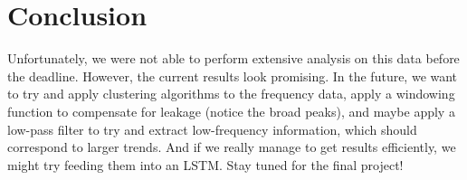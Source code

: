 \documentclass[final]{article}
\begin{document}














\section{Conclusion}

Unfortunately, we were not able to perform extensive analysis on this
data before the deadline. However, the current results look promising.
In the future, we want to try and apply clustering algorithms to the
frequency data, apply a windowing function to compensate for leakage
(notice the broad peaks), and maybe apply a low-pass filter to try and
extract low-frequency information, which should correspond to larger
trends. And if we really manage to get results efficiently, we might
try feeding them into an LSTM. Stay tuned for the final project!

\end{document}
